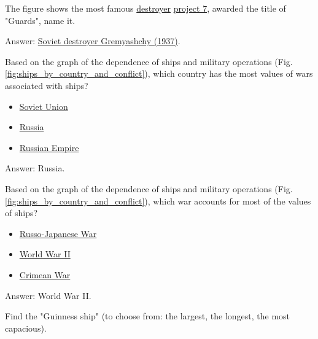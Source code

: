 
\begin{exercise}
	\label{answer:ship_1}
	The figure shows the most famous \href{https://en.wikipedia.org/wiki/Destroyer}{destroyer} \href{https://en.wikipedia.org/wiki/Gnevny-class_destroyer}{project 7}, awarded the title of "Guards", name it.
	  {
		\setlength{\fboxsep}{0pt}%
		\setlength{\fboxrule}{1pt}%
	  }
\end{exercise}
Answer: \href{https://en.wikipedia.org/wiki/Soviet_destroyer_Gremyashchy_(1937)}{Soviet destroyer Gremyashchy (1937)}.



\begin{exercise}
	\label{answer:ship_2}
	Based on the graph of the dependence of ships and military operations (Fig. \ref{fig:ships_by_country_and_conflict}), which country has the most values of wars associated with ships?
	\begin{itemize}
		\item \href{https://www.wikidata.org/wiki/Q15180}{Soviet Union}
		\item \href{https://www.wikidata.org/wiki/Q159}{Russia}
		\item \href{https://www.wikidata.org/wiki/Q34266}{Russian Empire}
	\end{itemize}
\end{exercise}
Answer: Russia.


\begin{exercise}
	\label{answer:ship_3}
	Based on the graph of the dependence of ships and military operations (Fig. \ref{fig:ships_by_country_and_conflict}), which war accounts for most of the values of ships?
	\begin{itemize}
	  \item \href{https://www.wikidata.org/wiki/Q159950}{Russo-Japanese War}
	  \item \href{https://www.wikidata.org/wiki/Q362}{World War II}
	  \item \href{https://www.wikidata.org/wiki/Q254106}{Crimean War}
	\end{itemize}
\end{exercise}
Answer: World War II.



\begin{exercise}
	\label{answer:ship_ex_1}
	Find the "Guinness ship" (to choose from: the largest, the longest, the most capacious).
\end{exercise}


